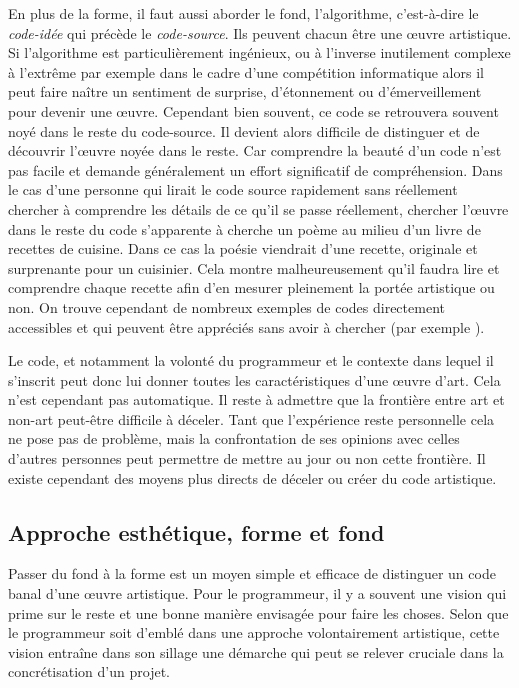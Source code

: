 \documentclass[12pt]{article} %
\begin{document}
En plus de la forme, il faut aussi aborder le fond, l'algorithme, c'est-à-dire le \textit{code-idée} qui précède le \textit{code-source}. Ils peuvent chacun être une œuvre artistique. Si l'algorithme est particulièrement ingénieux, ou à l'inverse inutilement complexe à l'extrême par exemple dans le cadre d'une compétition informatique alors il peut faire naître un sentiment de surprise, d'étonnement ou d'émerveillement pour devenir une œuvre. Cependant bien souvent, ce code se retrouvera souvent noyé dans le reste du code-source. Il devient alors difficile de distinguer et de découvrir l'œuvre noyée dans le reste. Car comprendre la beauté d'un code n'est pas facile et demande généralement un effort significatif de compréhension. Dans le cas d'une personne qui lirait le code source rapidement sans réellement chercher à comprendre les détails de ce qu'il se passe réellement, chercher l'œuvre dans le reste du code s'apparente à cherche un poème au milieu d'un livre de recettes de cuisine. Dans ce cas la poésie viendrait d'une recette, originale et surprenante pour un cuisinier. Cela montre malheureusement qu'il faudra lire et comprendre chaque recette afin d'en mesurer pleinement la portée artistique ou non. On trouve cependant de nombreux exemples de codes directement accessibles et qui peuvent être appréciés sans avoir à chercher (par exemple \cite{MEnriqueBermudez-ObfuscatedCCode}).

Le code, et notamment la volonté du programmeur et le contexte dans lequel il s'inscrit peut donc lui donner toutes les caractéristiques d'une œuvre d'art. Cela n'est cependant pas automatique. Il reste à admettre que la frontière entre art et non-art peut-être difficile à déceler. Tant que l'expérience reste personnelle cela ne pose pas de problème, mais la confrontation de ses opinions avec celles d'autres personnes peut permettre de mettre au jour ou non cette frontière. Il existe cependant des moyens plus directs de déceler ou créer du code artistique.

\subsection{Approche esthétique, forme et fond} %
Passer du fond à la forme est un moyen simple et efficace de distinguer un code banal d'une œuvre artistique. Pour le programmeur, il y a souvent une vision qui prime sur le reste et une bonne manière envisagée pour faire les choses. Selon que le programmeur soit d'emblé dans une approche volontairement artistique, cette vision entraîne dans son sillage une démarche qui peut se relever cruciale dans la concrétisation d'un projet.
\end{document}
